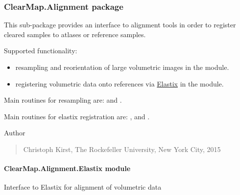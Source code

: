 \documentclass[letterpaper,10pt,english]{sphinxmanual}
\begin{document}
\subsubsection{ClearMap.Alignment package}
\label{api/ClearMap.Alignment::doc}\label{api/ClearMap.Alignment:clearmap-alignment-package}\label{api/ClearMap.Alignment:module-ClearMap.Alignment}
This sub-package provides an interface to alignment tools in order to
register cleared samples to atlases or reference samples.

Supported functionality:
\begin{itemize}
\item {} 
resampling and reorientation of large volumetric images in the
{\hyperref[api/ClearMap.Alignment:module-ClearMap.Alignment.Resampling]{\emph{}}} module.

\item {} 
registering volumetric data onto references via
\href{http://elastix.isi.uu.nl/}{Elastix} in the
{\hyperref[api/ClearMap.Alignment:module-ClearMap.Alignment.Elastix]{\emph{}}} module.

\end{itemize}

Main routines for resampling are:
{\hyperref[api/ClearMap.Alignment:ClearMap.Alignment.Resampling.resampleData]{\emph{}}}
and {\hyperref[api/ClearMap.Alignment:ClearMap.Alignment.Resampling.resamplePoints]{\emph{}}}.

Main routines for elastix registration are:
{\hyperref[api/ClearMap.Alignment:ClearMap.Alignment.Elastix.alignData]{\emph{}}},
{\hyperref[api/ClearMap.Alignment:ClearMap.Alignment.Elastix.transformData]{\emph{}}} and
{\hyperref[api/ClearMap.Alignment:ClearMap.Alignment.Elastix.transformPoints]{\emph{}}}.

Author
\begin{quote}

Christoph Kirst, The Rockefeller University, New York City, 2015
\end{quote}


\paragraph{ClearMap.Alignment.Elastix module}
\label{api/ClearMap.Alignment:clearmap-alignment-elastix-module}\label{api/ClearMap.Alignment:module-ClearMap.Alignment.Elastix}
Interface to Elastix for alignment of volumetric data
\end{document}
